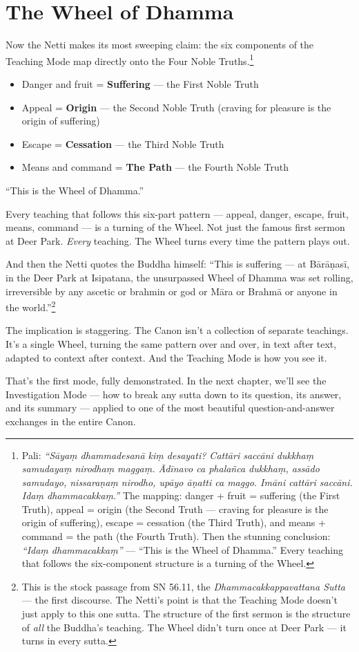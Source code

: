 \section*{The Wheel of Dhamma}

Now the Netti makes its most sweeping claim: the six components of the Teaching Mode map directly onto the Four Noble Truths.\footnote{Pali: \textit{``Sāyaṃ dhammadesanā kiṃ desayati? Cattāri saccāni dukkhaṃ samudayaṃ nirodhaṃ maggaṃ. Ādīnavo ca phalañca dukkhaṃ, assādo samudayo, nissaraṇaṃ nirodho, upāyo āṇatti ca maggo. Imāni cattāri saccāni. Idaṃ dhammacakkaṃ.''} The mapping: danger + fruit = suffering (the First Truth), appeal = origin (the Second Truth --- craving for pleasure is the origin of suffering), escape = cessation (the Third Truth), and means + command = the path (the Fourth Truth). Then the stunning conclusion: \textit{``Idaṃ dhammacakkaṃ''} --- ``This is the Wheel of Dhamma.'' Every teaching that follows the six-component structure is a turning of the Wheel.}

\begin{itemize}[itemsep=4pt]
\item Danger and fruit = \textbf{Suffering} --- the First Noble Truth
\item Appeal = \textbf{Origin} --- the Second Noble Truth (craving for pleasure is the origin of suffering)
\item Escape = \textbf{Cessation} --- the Third Noble Truth
\item Means and command = \textbf{The Path} --- the Fourth Noble Truth
\end{itemize}

``This is the Wheel of Dhamma.''

Every teaching that follows this six-part pattern --- appeal, danger, escape, fruit, means, command --- is a turning of the Wheel. Not just the famous first sermon at Deer Park. \textit{Every} teaching. The Wheel turns every time the pattern plays out.

And then the Netti quotes the Buddha himself: ``This is suffering --- at Bārāṇasī, in the Deer Park at Isipatana, the unsurpassed Wheel of Dhamma was set rolling, irreversible by any ascetic or brahmin or god or Māra or Brahmā or anyone in the world.''\footnote{This is the stock passage from SN 56.11, the \textit{Dhammacakkappavattana Sutta} --- the first discourse. The Netti's point is that the Teaching Mode doesn't just apply to this one sutta. The structure of the first sermon is the structure of \textit{all} the Buddha's teaching. The Wheel didn't turn once at Deer Park --- it turns in every sutta.}

The implication is staggering. The Canon isn't a collection of separate teachings. It's a single Wheel, turning the same pattern over and over, in text after text, adapted to context after context. And the Teaching Mode is how you see it.

\ornament

\noindent That's the first mode, fully demonstrated. In the next chapter, we'll see the Investigation Mode --- how to break any sutta down to its question, its answer, and its summary --- applied to one of the most beautiful question-and-answer exchanges in the entire Canon.
